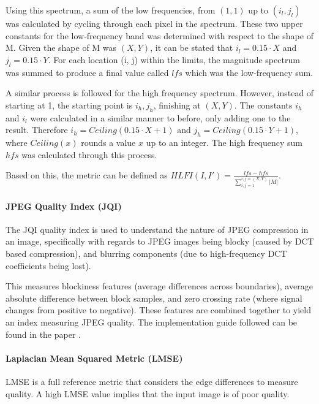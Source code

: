 \documentclass[12pt,a4paper]{article}
\begin{document}
                Using this spectrum, a sum of the low frequencies, from $(1,1)$ up to $(i_l, j_l)$ was calculated by cycling through each pixel in the spectrum. These two upper constants for
                the low-frequency band was determined with respect to the shape of M. Given the shape of M was $(X, Y)$, it can be stated that $i_l = 0.15 \cdot X$ and $j_l = 0.15 \cdot Y$.
                For each location (i, j) within the limits, the magnitude spectrum was summed to produce a final value called $lfs$ which was the low-frequency sum.

                A similar process is followed for the high frequency spectrum. However, instead of starting at 1, the starting point is $i_h, j_h$, finishing at $(X, Y)$. The constants $i_h$ and $i_l$ were
                calculated in a similar manner to before, only adding one to the result. Therefore $i_h = Ceiling(0.15 \cdot X + 1)$ and $j_h = Ceiling(0.15 \cdot Y + 1)$, where $Ceiling(x)$ rounds
                a value $x$ up to an integer. The high frequency sum $hfs$ was calculated through this process.

                Based on this, the metric can be defined as $HLFI(I, I') = \frac{lfs - hfs}{\sum_{i,j = 1}^{i,j = (X, Y)} |M|}$.
                
            \paragraph{JPEG Quality Index (JQI)}
                The JQI quality index is used to understand the nature of JPEG compression in an image, specifically with regards to JPEG images being blocky (caused by DCT based compression),
                and blurring components (due to high-frequency DCT coefficients being lost).

                This measures blockiness features (average differences across boundaries), average absolute difference between block samples, and zero crossing rate (where signal changes from positive to negative). 
                These features are combined together to yield an index measuring JPEG quality. The implementation guide followed can be found in the paper \cite{JQIPaper}.
            
                \paragraph{Laplacian Mean Squared Metric (LMSE)}
                LMSE is a full reference metric that considers the edge differences to measure quality. A high LMSE value implies that the input image is of poor quality. 
                    
\end{document}

